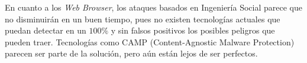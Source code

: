 \documentclass{sig-alternate-05-2015}
\begin{document}
En cuanto a los \textit{Web Browser}, los ataques basados en Ingeniería Social parece que no disminuirán en un buen tiempo, pues no existen tecnologías actuales que puedan detectar en un \(100\%\) y sin falsos positivos los posibles peligros que pueden traer. Tecnologías como CAMP (Content-Agnostic Malware Protection) parecen ser parte de la solución, pero aún están lejos de ser perfectos.




  
\end{document}

